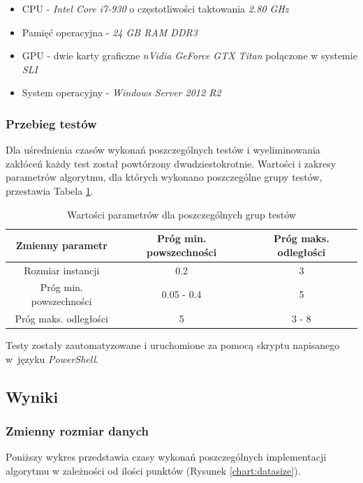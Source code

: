 \documentclass[12pt]{article}
\begin{document}
\begin{itemize}
\item CPU - \textit{Intel Core i7-930} o częstotliwości taktowania \textit{2.80 GHz}
\item Pamięć operacyjna - \textit{24 GB RAM DDR3}
\item GPU - dwie karty graficzne \textit{nVidia GeForce GTX Titan} połączone w systemie \textit{SLI}
\item System operacyjny - \textit{Windows Server 2012 R2}
\end{itemize}

\subsubsection{Przebieg testów}

Dla uśrednienia czasów wykonań poszczególnych testów i wyeliminowania zakłóceń każdy test został powtórzony dwudziestokrotnie. Wartości i zakresy parametrów algorytmu, dla których wykonano poszczególne grupy testów, przestawia Tabela \ref{tab:params}.

\begin{table}[h!]
\centering
\begin{tabular}{|c|c|c|}
\hline
\textbf{Zmienny parametr} & \textbf{Próg min. powszechności} & \textbf{Próg maks. odległości} \\
\hline
Rozmiar instancji & 0.2 & 3 \\
Próg min. powszechności & 0.05 - 0.4 & 5 \\
Próg maks. odległości & 5 & 3 - 8 \\
\hline
\end{tabular}
\caption{Wartości parametrów dla poszczególnych grup testów}
\label{tab:params}
\end{table}

Testy zostały zautomatyzowane i uruchomione za pomocą skryptu napisanego w~języku \textit{PowerShell}.

\subsection{Wyniki}

\subsubsection{Zmienny rozmiar danych}

Poniższy wykres przedstawia czasy wykonań poszczególnych implementacji algorytmu w zależności od ilości punktów (Rysunek \ref{chart:datasize}).
\end{document}

